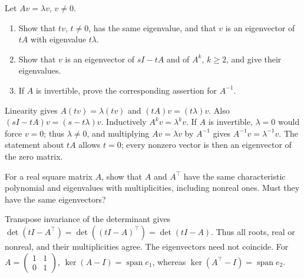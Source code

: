 \begin{problem}\label{ex:08:polynomials}
Let \(Av=\lambda v\), \(v\ne0\).
\begin{enumerate}
\item Show that \(tv\), \(t\ne0\), has the same eigenvalue, and that
\(v\) is an eigenvector of \(tA\) with eigenvalue \(t\lambda\).
\item Show that \(v\) is an eigenvector of \(sI-tA\) and of \(A^k\),
\(k\geqslant2\), and give their eigenvalues.
\item If \(A\) is invertible, prove the corresponding assertion for \(A^{-1}\).
\end{enumerate}
\end{problem}
\begin{solution}
Linearity gives \(A(tv)=\lambda(tv)\) and \((tA)v=(t\lambda)v\).
Also \((sI-tA)v=(s-t\lambda)v\).
Inductively \(A^kv=\lambda^kv\).
If \(A\) is invertible, \(\lambda=0\) would force \(v=0\); thus
\(\lambda\ne0\), and multiplying \(Av=\lambda v\) by \(A^{-1}\) gives
\(A^{-1}v=\lambda^{-1}v\).
The statement about \(tA\) allows \(t=0\); every nonzero vector is then
an eigenvector of the zero matrix.
\end{solution}

\begin{problem}\label{ex:08:transpose}
For a real square matrix \(A\), show that \(A\) and \(A^\top\) have the
same characteristic polynomial and eigenvalues with multiplicities,
including nonreal ones.
Must they have the same eigenvectors?
\end{problem}
\begin{solution}
Transpose invariance of the determinant gives
\(\det(tI-A^\top)=\det((tI-A)^\top)=\det(tI-A)\).
Thus all roots, real or nonreal, and their multiplicities agree.
The eigenvectors need not coincide. For
\(A=\begin{pmatrix}1&1\\0&1\end{pmatrix}\),
\(\ker(A-I)=\operatorname{span}e_1\), whereas
\(\ker(A^\top-I)=\operatorname{span}e_2\).
\end{solution}

